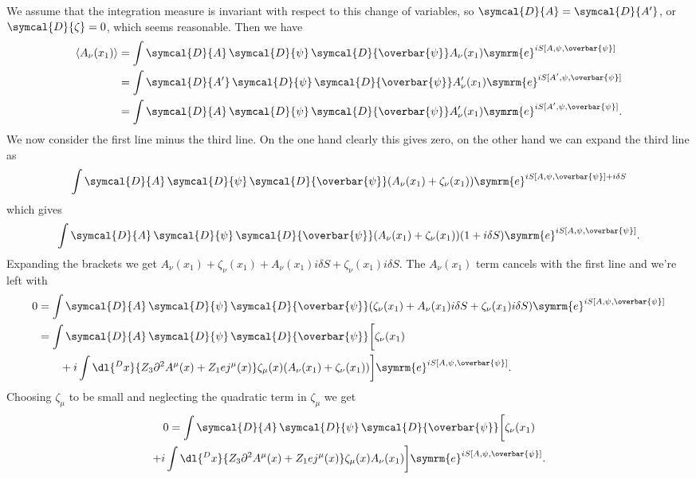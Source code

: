 \documentclass[fleqn]{NotesClass}
\newcommand{\e}{\symrm{e}}
\newcommand{\diracadjoint}[1]{\overbar{#1}}
\newcommand{\DL}[1]{\symcal{D}{#1}}
\newcommand{\DD}[1]{\,\symcal{D}{#1}}
\DeclarePairedDelimiter{\correlator}{\langle}{\rangle}
\newcommand{\dalembertian}{\partial^2}
\begin{document}
    We assume that the integration measure is invariant with respect to this change of variables, so \(\DL{A} = \DL{A'}\), or \(\DL{\zeta} = 0\), which seems reasonable.
    Then we have
    \begin{align}
        \correlator{A_\nu(x_1)} &= \int \DL{A} \DD{\psi} \DD{\diracadjoint{\psi}} A_\nu(x_1) \e^{iS[A, \psi, \diracadjoint{\psi}]}\\
        &= \int \DL{A'} \DD{\psi} \DD{\diracadjoint{\psi}} A'_\nu(x_1) \e^{iS[A', \psi, \diracadjoint{\psi}]}\\
        &= \int \DL{A} \DD{\psi} \DD{\diracadjoint{\psi}} A'_\nu(x_1) \e^{iS[A', \psi, \diracadjoint{\psi}]}.
    \end{align}
    We now consider the first line minus the third line.
    On the one hand clearly this gives zero, on the other hand we can expand the third line as
    \begin{equation}
        \int \DL{A} \DD{\psi} \DD{\diracadjoint{\psi}} (A_\nu(x_1) + \zeta_\nu(x_1))\e^{iS[A, \psi, \diracadjoint{\psi}] + i\delta S}
    \end{equation}
    which gives
    \begin{equation}
        \int \DL{A} \DD{\psi} \DD{\diracadjoint{\psi}} (A_\nu(x_1) + \zeta_\nu(x_1))(1 + i\delta S)\e^{iS[A, \psi, \diracadjoint{\psi}]}.
    \end{equation}
    Expanding the brackets we get \(A_\nu(x_1) + \zeta_\nu(x_1) + A_\nu(x_1) i\delta S + \zeta_\nu(x_1) i\delta S\).
    The \(A_\nu(x_1)\) term cancels with the first line and we're left with
    \begin{align}
        0 &= \int \DL{A} \DD{\psi} \DD{\diracadjoint{\psi}} (\zeta_\nu(x_1) + A_\nu(x_1) i\delta S + \zeta_\nu(x_1) i\delta S) \e^{iS[A, \psi, \diracadjoint{\psi}]}\\
        &= \int \DL{A} \DD{\psi} \DD{\diracadjoint{\psi}} \bigg[\zeta_\nu(x_1) \notag\\
        &\qquad + i \int\dl{^Dx} \{Z_3 \dalembertian A^\mu(x) + Z_1 ej^\mu(x)\}\zeta_\mu(x)(A_\nu(x_1) + \zeta_\nu(x_1))\bigg] \e^{iS[A, \psi, \diracadjoint{\psi}]}.
    \end{align}
    Choosing \(\zeta_\mu\) to be small and neglecting the quadratic term in \(\zeta_\mu\) we get
    \begin{multline}
        0 = \int \DL{A} \DD{\psi} \DD{\diracadjoint{\psi}} \bigg[\zeta_\nu(x_1) \notag\\
        + i \int\dl{^Dx} \{Z_3 \dalembertian A^\mu(x) + Z_1 ej^\mu(x)\}\zeta_\mu(x)A_\nu(x_1)\bigg] \e^{iS[A, \psi, \diracadjoint{\psi}]}.
    \end{multline}
\end{document}

